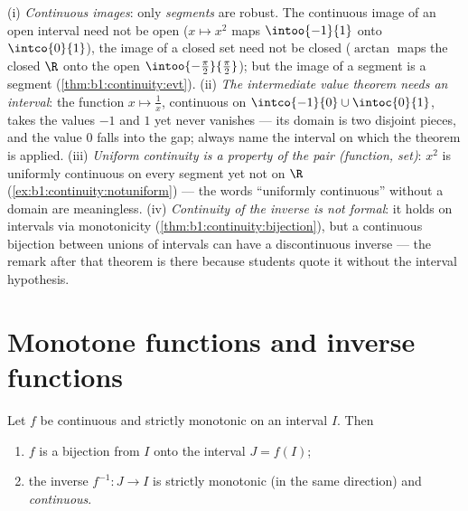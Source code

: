 \begin{remark}
(i) \emph{Continuous images}: only \emph{segments} are robust.
The continuous image of an open interval need not be open
($x \mapsto x^2$ maps $\intoo{-1}{1}$ onto $\intco{0}{1}$), the
image of a closed set need not be closed ($\arctan$ maps the
closed $\R$ onto the open
$\intoo{-\frac\pi2}{\frac\pi2}$); but the image of a segment is
a segment (\cref{thm:b1:continuity:evt}). (ii) \emph{The
intermediate value theorem needs an interval}: the function $x
\mapsto \frac1x$, continuous on $\intco{-1}{0} \cup
\intoc{0}{1}$, takes the values $-1$ and $1$ yet never
vanishes --- its domain is two disjoint pieces, and the value
$0$ falls into the gap; always name the interval on which the
theorem is applied. (iii) \emph{Uniform continuity is a property of the
pair (function, set)}: $x^2$ is uniformly continuous on every
segment yet not on $\R$
(\cref{ex:b1:continuity:notuniform}) --- the words ``uniformly
continuous'' without a domain are meaningless. (iv)
\emph{Continuity of the inverse is not formal}: it holds on
intervals via monotonicity
(\cref{thm:b1:continuity:bijection}), but a continuous bijection
between unions of intervals can have a discontinuous inverse ---
the remark after that theorem is there because students quote it
without the interval hypothesis.
\end{remark}

\section{Monotone functions and inverse functions}

\begin{theorem}\label{thm:b1:continuity:bijection}
Let $f$ be continuous and strictly monotonic on an interval $I$. Then
\begin{enumerate}
  \item $f$ is a bijection from $I$ onto the interval $J = f(I)$;
  \item the inverse $f^{-1} \colon J \to I$ is strictly monotonic (in
        the same direction) and \emph{continuous}.
\end{enumerate}
\end{theorem}

